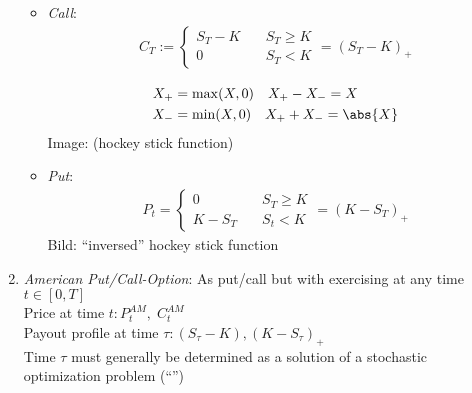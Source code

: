 \begin{enumerate}
	\begin{itemize}
		\item \emph{Call}:
		\begin{align*}
		C_T := \begin{cases}
		S_T - K &\quad S_T \ge K\\
		0 &\quad S_T < K
		\end{cases} = (S_T - K)_+ %
		\end{align*}
		\begin{*remark}
			\begin{align*}
			X_{+} &= \max(X,0)\quad X_{+} - X_{-} = X\\
			X_{-} &= \min(X,0)\quad X_{+} + X_{-} = \abs{X}
			\end{align*}
          	Image: (hockey stick function)
		\end{*remark}
		\item \emph{Put}:
		\begin{align*}
		P_t = \begin{cases}
		0 &\quad S_T \ge K\\
		K-S_T &\quad S_t < K
		\end{cases} = (K-S_T)_+
		\end{align*}
		Bild: ``inversed'' hockey stick function 
	\end{itemize}
	\item \emph{American Put/Call-Option}: As put/call but with exercising at any time $t \in [0,T]$\\
	Price at time $t\colon P_t^{AM}, \; C_t^{AM}$\\
	Payout profile at time $\tau\colon (S_{\tau}-K), (K-S_{\tau})_+$\\
	Time $\tau$ must generally be determined as a solution of a stochastic optimization problem (``'')
\end{enumerate}
